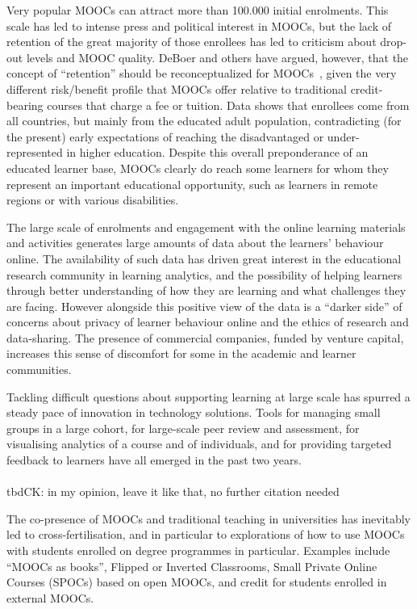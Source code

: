 Very popular MOOCs can attract
more than 100.000 initial enrolments.  This scale has led to intense press
and political interest in MOOCs, but the lack of retention of the great
majority of those enrollees has led to
criticism about drop-out levels and MOOC quality.  
DeBoer and others have argued, however, that the concept of ``retention''
should be reconceptualized for MOOCs~\cite{deboer-ho-reconceptualizing},
given the very different 
risk/benefit profile that MOOCs offer relative to traditional
credit-bearing courses
that charge a fee or tuition.
Data shows that enrollees come from all countries, but mainly from the
educated adult population, contradicting (for the present) early
expectations of reaching the disadvantaged or under-represented in
higher education.  Despite this overall preponderance of an educated
learner base, MOOCs clearly do reach some learners for whom they
represent an important educational opportunity, such as learners in
remote regions or
with various disabilities.

The large scale of enrolments and engagement with the online learning
materials and activities generates large amounts of data about the
learners' behaviour online.  The availability of such data has driven
great interest in the educational research community in learning
analytics, and the possibility of helping learners through better
understanding of how they are learning and what challenges they are
facing.  However alongside this positive view of the data is a ``darker
side'' of concerns about privacy of learner behaviour online and the
ethics of research and data-sharing.  The presence of commercial
companies, funded by venture capital, increases this sense of discomfort
for some in the academic and learner communities.

Tackling difficult questions about supporting learning
at large scale has spurred a steady pace of innovation in
technology solutions.  Tools for managing small groups in a large
cohort, for large-scale peer review and assessment, for visualising
analytics of a course and of individuals, and for providing targeted
feedback 
to learners have all emerged in the past two years.  
\\
\\tbd{CK: in my opinion, leave it like that, no further citation needed}

The co-presence of MOOCs and traditional teaching in universities has
inevitably led to cross-fertilisation, and in particular to explorations
of how to use MOOCs with students enrolled on degree programmes in
particular.  Examples include ``MOOCs as books'', Flipped or Inverted
Classrooms, Small Private Online Courses (SPOCs) based on open MOOCs,
and credit for students enrolled in external MOOCs.

